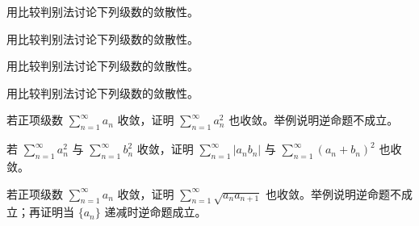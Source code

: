 \noindent\begin{minipage}{\textwidth}
用比较判别法讨论下列级数的敛散性。
\end{minipage}\par\vfill
\newpage
\noindent\begin{minipage}{\textwidth}
用比较判别法讨论下列级数的敛散性。
\end{minipage}\par\vfill
\noindent\begin{minipage}{\textwidth}
用比较判别法讨论下列级数的敛散性。
\end{minipage}\par\vfill
\noindent\begin{minipage}{\textwidth}
用比较判别法讨论下列级数的敛散性。
\end{minipage}\par\vfill
\newpage
\noindent\begin{minipage}{\textwidth}
若正项级数 $\sum_{n=1}^{\infty}a_n$ 收敛，证明 $\sum_{n=1}^{\infty}a_n^2$ 也收敛。举例说明逆命题不成立。
\end{minipage}\par\vfill
\noindent\begin{minipage}{\textwidth}
若 $\sum_{n=1}^{\infty}a_n^2$ 与 $\sum_{n=1}^{\infty}b_n^2$ 收敛，证明 $\sum_{n=1}^{\infty}|a_nb_n|$ 与 $\sum_{n=1}^{\infty}(a_n+b_n)^2$ 也收敛。
\end{minipage}\par\vfill
\noindent\begin{minipage}{\textwidth}
若正项级数 $\sum_{n=1}^{\infty}a_n$ 收敛，证明 $\sum_{n=1}^{\infty}\sqrt{a_na_{n+1}}$ 也收敛。举例说明逆命题不成立；再证明当 $\{a_n\}$ 递减时逆命题成立。
\end{minipage}\par\vfill
